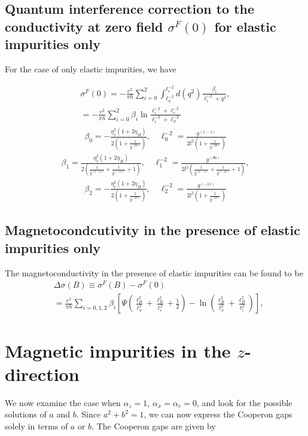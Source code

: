 \documentclass[aps,prb,amsmath,amssymb,footinbib,showpacs,twocolumn]{revtex4-2}
\begin{document}
\begin{widetext}
\subsection{Quantum interference correction to the conductivity
at zero field $\sigma^{F}(0)$ for elastic impurities only}
For the case of only elastic impurities, we have

\begin{align}
     \sigma^{F}(0)= -\frac{e^{2}}{\pi h}\sum_{i= 0}^{2}\int_{\ell^{-2}_{\phi}}^{\ell^{-2}_{e}}d(q^{2})\frac{\beta_{i}}{\ell^{-2}_{i}+q^{2}}, \\
    = -\frac{e^{2}}{\pi h}\sum_{i= 0}^{2
    }\beta_{i} \ln\frac{\ell^{-2}_{i}+\ell^{-2}_{e}}{\ell^{-2}_{i}+\ell^{-2}_{\phi}}
\end{align}
\begin{align}
      \beta_{0}= -\frac{\eta^{2}_{v}(1+2\eta_{H})}{2(1+\frac{1}{g^{(00)}})}, \quad \ell^{-2}_{0} = \frac{g^{(1-1)}}{2l^{2}(1+\frac{1}{g^{(00)}})} 
\end{align}
\begin{align}
     \beta_{1}= \frac{\eta^{2}_{v}(1+2\eta_{H})}{2(\frac{1}{g^{(1-1)}}+\frac{1}{g^{(-11)}}+1)}, \quad \ell^{-2}_{1} = \frac{g^{(00)}}{2l^{2}(\frac{1}{g^{(1-1)}}+\frac{1}{g^{(-11)}}+1)},
\end{align}
\begin{align}
      \beta_{2}= -\frac{\eta^{2}_{v}(1+2\eta_{H})}{2(1+\frac{1}{g^{(00)}})}, \quad \ell^{-2}_{2} = \frac{g^{(-11)}}{2l^{2}(1+\frac{1}{g^{(00)}})} 
\end{align}
\subsection{Magnetocondcutivity in the presence of elastic impurities only}
The magnetoconductivity in the presence of elastic impurities can be found to be 
\begin{align}
    &\Delta\sigma(B) \equiv  \sigma^{F}(B)- \sigma^{F}(0) \nonumber\\ 
    &=\frac{e^{2}}{\pi h}\sum_{i=0,1, 2}\beta_{i}\left[\Psi\left(\frac{\ell^{2}_{B}}{\ell^{2}_{\phi}}+\frac{\ell^{2}_{B}}{\ell^{2}_{i}}+\frac{1}{2}\right)-\ln\left(\frac{\ell^{2}_{B}}{\ell^{2}_{\phi}}+\frac{\ell^{2}_{B}}{\ell^{2}_{i}}\right)\right],
\end{align}
\section{Magnetic impurities in the $z$-direction}
We now examine the case when $\alpha_z=1$, $\alpha_x=\alpha_e=0$, and look for the possible solutions of $a$ and $b$. Since $a^2+b^2=1$, we can now express the Cooperon gaps solely in terms of $a$ or $b$. The Cooperon gaps are given by 


\end{widetext}
\end{document}
